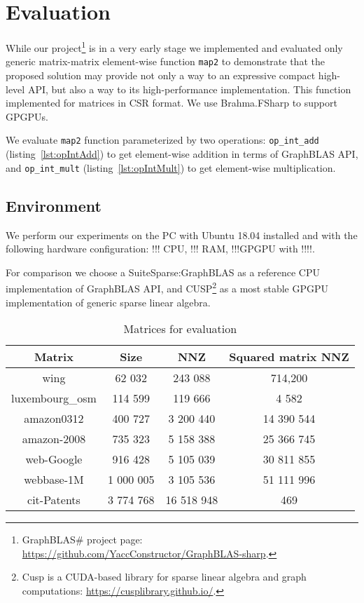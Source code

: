 \section{Evaluation}

While our project\footnote{GraphBLAS\# project page: \url{https://github.com/YaccConstructor/GraphBLAS-sharp}.} is in a very early stage we implemented and evaluated only generic matrix-matrix element-wise function \texttt{map2} to demonstrate that the proposed solution may provide not only a way to an expressive compact high-level API, but also a way to its high-performance implementation. This function implemented for matrices in CSR format. We use Brahma.FSharp to support GPGPUs.  

We evaluate \texttt{map2} function parameterized by two operations: \texttt{op\_int\_add} (listing~\ref{lst:opIntAdd}) to get element-wise addition in terms of GraphBLAS API, and \texttt{op\_int\_mult} (listing~\ref{lst:opIntMult}) to get element-wise multiplication.

\subsection{Environment}
We perform our experiments on the PC with Ubuntu 18.04 installed and with the following hardware configuration: !!! CPU, !!! RAM, !!!GPGPU with !!!!.

For comparison we choose a SuiteSparse:GraphBLAS as a reference CPU implementation of GraphBLAS API, and CUSP\footnote{Cusp is a CUDA-based library for sparse linear algebra and graph computations: \url{https://cusplibrary.github.io/}.} as a most stable GPGPU implementation of generic sparse linear algebra.

\begin{table}[H]
    \centering
    \caption{Matrices for evaluation}
    \label{matrices}  
    \begin{tabular}{ | c || c | c | c | }
    \hline
    Matrix & Size & NNZ & Squared matrix NNZ \\ \hline
    \hline
    wing & 62 032 & 243 088 & 714,200 \\ \hline
    luxembourg\_osm & 114 599 & 119 666 & 4 582 \\ \hline
    amazon0312 & 400 727 & 3 200 440 & 14 390 544 \\ \hline
    amazon-2008 & 735 323 & 5 158 388 & 25 366 745 \\ \hline
    web-Google & 916 428 & 5 105 039 & 30 811 855 \\ \hline
    webbase-1M & 1 000 005 & 3 105 536 & 51 111 996 \\ \hline
    cit-Patents & 3 774 768 & 16 518 948 & 469 \\ \hline
    \end{tabular}
\end{table}


